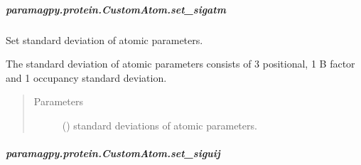 \documentclass[a4paper,10pt,english,openany,oneside]{sphinxmanual}
\begin{document}
\begin{fulllineitems}
\begin{fulllineitems}
\begin{fulllineitems}
\end{fulllineitems}



\subparagraph{paramagpy.protein.CustomAtom.set\_sigatm}
\label{\detokenize{reference/generated/paramagpy.protein.CustomAtom.set_sigatm:paramagpy-protein-customatom-set-sigatm}}\label{\detokenize{reference/generated/paramagpy.protein.CustomAtom.set_sigatm::doc}}

\begin{fulllineitems}
\label{\detokenize{reference/generated/paramagpy.protein.CustomAtom.set_sigatm:paramagpy.protein.CustomAtom.set_sigatm}}
\sphinxAtStartPar
Set standard deviation of atomic parameters.

\sphinxAtStartPar
The standard deviation of atomic parameters consists
of 3 positional, 1 B factor and 1 occupancy standard
deviation.
\begin{quote}\begin{description}
\item[{Parameters}] \leavevmode
\sphinxAtStartPar
{} (\sphinxstyleliteralemphasis{\sphinxupquote{ (}}\sphinxstyleliteralemphasis{\sphinxupquote{)}}) \textendash{} standard deviations of atomic parameters.

\end{description}\end{quote}

\end{fulllineitems}



\subparagraph{paramagpy.protein.CustomAtom.set\_siguij}
\label{\detokenize{reference/generated/paramagpy.protein.CustomAtom.set_siguij:paramagpy-protein-customatom-set-siguij}}\label{\detokenize{reference/generated/paramagpy.protein.CustomAtom.set_siguij::doc}}


\end{fulllineitems}
\end{fulllineitems}
\end{document}
